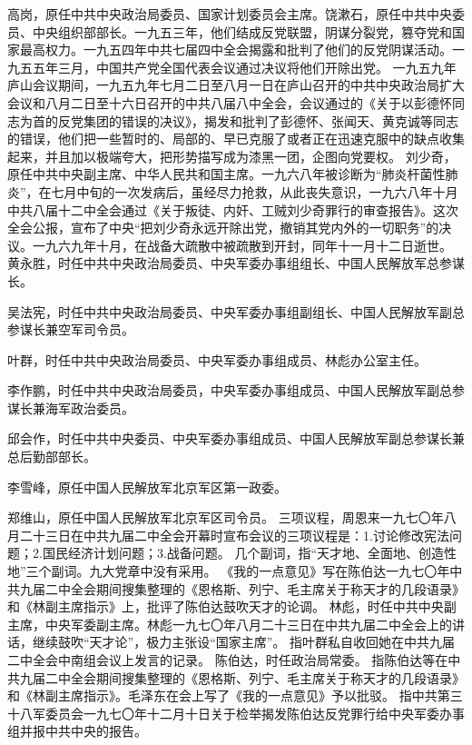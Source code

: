 \begin{maonote}
高岗，原任中共中央政治局委员、国家计划委员会主席。饶漱石，原任中共中央委员、中央组织部部长。一九五三年，他们结成反党联盟，阴谋分裂党，篡夺党和国家最高权力。一九五四年中共七届四中全会揭露和批判了他们的反党阴谋活动。一九五五年三月，中国共产党全国代表会议通过决议将他们开除出党。
一九五九年庐山会议期间，一九五九年七月二日至八月一日在庐山召开的中共中央政治局扩大会议和八月二日至十六日召开的中共八届八中全会，会议通过的《关于以彭德怀同志为首的反党集团的错误的决议》，揭发和批判了彭德怀、张闻天、黄克诚等同志的错误，他们把一些暂时的、局部的、早已克服了或者正在迅速克服中的缺点收集起来，并且加以极端夸大，把形势描写成为漆黑一团，企图向党要权。
刘少奇，原任中共中央副主席、中华人民共和国主席。一九六八年被诊断为“肺炎杆菌性肺炎”，在七月中旬的一次发病后，虽经尽力抢救，从此丧失意识，一九六八年十月中共八届十二中全会通过《关于叛徒、内奸、工贼刘少奇罪行的审查报告》。这次全会公报，宣布了中央“把刘少奇永远开除出党，撤销其党内外的一切职务”的决议。一九六九年十月，在战备大疏散中被疏散到开封，同年十一月十二日逝世。
黄永胜，时任中共中央政治局委员、中央军委办事组组长、中国人民解放军总参谋长。

吴法宪，时任中共中央政治局委员、中央军委办事组副组长、中国人民解放军副总参谋长兼空军司令员。

叶群，时任中共中央政治局委员、中央军委办事组成员、林彪办公室主任。

李作鹏，时任中共中央政治局委员，中央军委办事组成员、中国人民解放军副总参谋长兼海军政治委员。

邱会作，时任中共中央委员、中央军委办事组成员、中国人民解放军副总参谋长兼总后勤部部长。

李雪峰，原任中国人民解放军北京军区第一政委。

郑维山，原任中国人民解放军北京军区司令员。
三项议程，周恩来一九七〇年八月二十三日在中共九届二中全会开幕时宣布会议的三项议程是：1.讨论修改宪法问题；2.国民经济计划问题；3.战备问题。
几个副词，指“天才地、全面地、创造性地”三个副词。九大党章中没有采用。
《我的一点意见》写在陈伯达一九七〇年中共九届二中全会期间搜集整理的《恩格斯、列宁、毛主席关于称天才的几段语录》和《林副主席指示》上，批评了陈伯达鼓吹天才的论调。
林彪，时任中共中央副主席，中央军委副主席。林彪一九七〇年八月二十三日在中共九届二中全会上的讲话，继续鼓吹“天才论”，极力主张设“国家主席”。
指叶群私自收回她在中共九届二中全会中南组会议上发言的记录。
陈伯达，时任政治局常委。
指陈伯达等在中共九届二中全会期间搜集整理的《恩格斯、列宁、毛主席关于称天才的几段语录》和《林副主席指示》。毛泽东在会上写了《我的一点意见》予以批驳。
指中共第三十八军委员会一九七〇年十二月十日关于检举揭发陈伯达反党罪行给中央军委办事组并报中共中央的报告。


\end{maonote}
